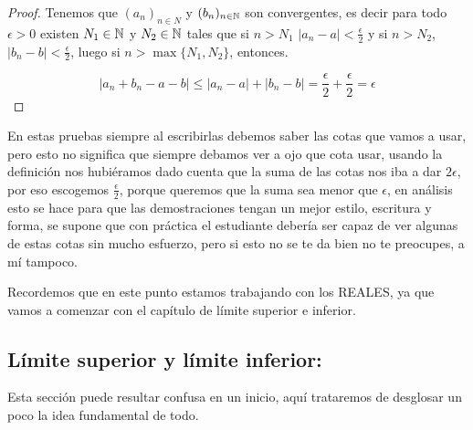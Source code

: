 \begin{itemize}[leftmargin=*]
\begin{proof}
    Tenemos que $(a_n)_{n\in N}$ y $(b_n)_{n\in \N}$ son convergentes, es decir para todo $\epsilon>0$ existen $N_1\in \N$ y $N_2\in \N$ tales que si $n>N_1$ $|a_n-a|<\frac{\epsilon}{2}$ y si $n>N_2$, $|b_n-b|<\frac{\epsilon}{2}$, luego si $n>\max\{N_1,N_2\}$, entonces.

    $$|a_n+b_n-a-b|\leq |a_n-a|+|b_n-b|=\frac{\epsilon}{2}+\frac{\epsilon}{2}=\epsilon$$
\end{proof}

\begin{note}
En estas pruebas siempre al escribirlas debemos saber las cotas que vamos a usar, pero esto no significa que siempre debamos ver a ojo que cota usar, usando la definición nos hubiéramos dado cuenta que la suma de las cotas nos iba a dar $2\epsilon$, por eso escogemos $\frac{\epsilon}{2}$, porque queremos que la suma sea menor que $\epsilon$, en análisis esto se hace para que las demostraciones tengan un mejor estilo, escritura y forma, se supone que con práctica el estudiante debería ser capaz de ver algunas de estas cotas sin mucho esfuerzo, pero si esto no se te da bien no te preocupes, a mí tampoco.
\end{note} 

Recordemos que en este punto estamos trabajando con los REALES, ya que vamos a comenzar con el capítulo de límite superior e inferior.


\subsection{Límite superior y límite inferior:}

Esta sección puede resultar confusa en un inicio, aquí trataremos de desglosar un poco la idea fundamental de todo.

\begin{tikznt}
\centering
{} %

\begin{tikzpicture}[x=0.75pt,y=0.75pt,yscale=-1,xscale=1.5]


\end{tikzpicture}
\end{tikznt}
\end{itemize}

